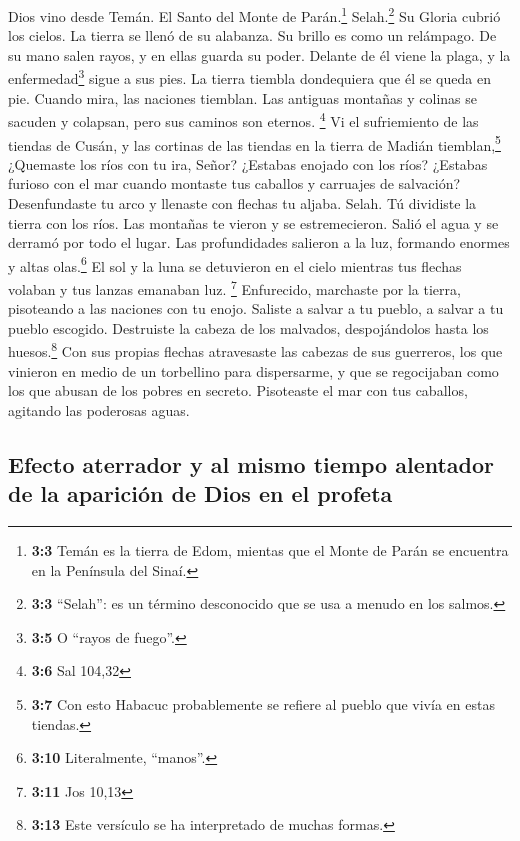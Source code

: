  Dios vino desde Temán. El Santo del Monte de
Parán.\footnote{\textbf{3:3} Temán es la tierra de Edom, mientas que el
  Monte de Parán se encuentra en la Península del Sinaí.}
Selah.\footnote{\textbf{3:3} ``Selah'': es un término desconocido que se
  usa a menudo en los salmos.} Su Gloria cubrió los cielos. La tierra se
llenó de su alabanza.  Su brillo es como un relámpago. De
su mano salen rayos, y en ellas guarda su poder.  Delante
de él viene la plaga, y la enfermedad\footnote{\textbf{3:5} O ``rayos de
  fuego''.} sigue a sus pies.  La tierra tiembla
dondequiera que él se queda en pie. Cuando mira, las naciones tiemblan.
Las antiguas montañas y colinas se sacuden y colapsan, pero sus caminos
son eternos. \footnote{\textbf{3:6} Sal 104,32}  Vi el
sufriemiento de las tiendas de Cusán, y las cortinas de las tiendas en
la tierra de Madián tiemblan,\footnote{\textbf{3:7} Con esto Habacuc
  probablemente se refiere al pueblo que vivía en estas tiendas.}
 ¿Quemaste los ríos con tu ira, Señor? ¿Estabas enojado
con los ríos? ¿Estabas furioso con el mar cuando montaste tus caballos y
carruajes de salvación?  Desenfundaste tu arco y llenaste
con flechas tu aljaba. Selah. Tú dividiste la tierra con los ríos.
 Las montañas te vieron y se estremecieron. Salió el agua
y se derramó por todo el lugar. Las profundidades salieron a la luz,
formando enormes y altas olas.\footnote{\textbf{3:10} Literalmente,
  ``manos''.}  El sol y la luna se detuvieron en el cielo
mientras tus flechas volaban y tus lanzas emanaban luz. \footnote{\textbf{3:11}
  Jos 10,13}  Enfurecido, marchaste por la tierra,
pisoteando a las naciones con tu enojo.  Saliste a salvar
a tu pueblo, a salvar a tu pueblo escogido. Destruiste la cabeza de los
malvados, despojándolos hasta los huesos.\footnote{\textbf{3:13} Este
  versículo se ha interpretado de muchas formas.}  Con
sus propias flechas atravesaste las cabezas de sus guerreros, los que
vinieron en medio de un torbellino para dispersarme, y que se
regocijaban como los que abusan de los pobres en secreto.
 Pisoteaste el mar con tus caballos, agitando las
poderosas aguas.

\hypertarget{efecto-aterrador-y-al-mismo-tiempo-alentador-de-la-apariciuxf3n-de-dios-en-el-profeta}{%
\subsection{Efecto aterrador y al mismo tiempo alentador de la aparición
de Dios en el
profeta}\label{efecto-aterrador-y-al-mismo-tiempo-alentador-de-la-apariciuxf3n-de-dios-en-el-profeta}}

